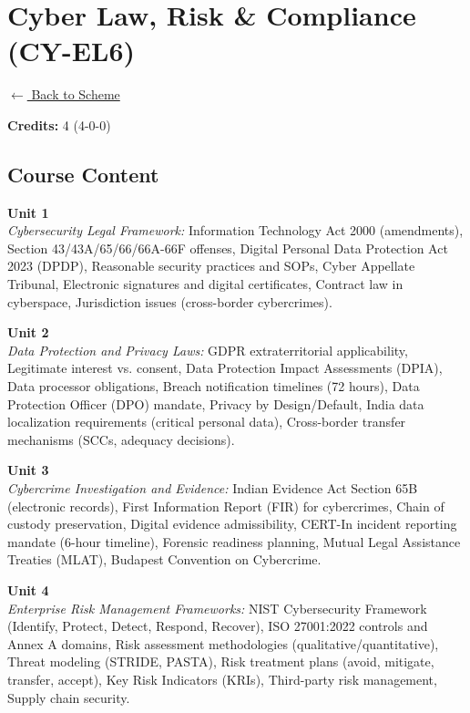 \section*{Cyber Law, Risk \& Compliance (CY-EL6)}
\label{elec:CY_6}

\noindent \small{\hyperref[main:scheme]{$\leftarrow$ Back to Scheme}} \vspace{0.5cm}

\noindent \textbf{Credits:} 4 (4-0-0)

\subsection*{Course Content}
\noindent\textbf{Unit 1} \\
\textit{Cybersecurity Legal Framework:} Information Technology Act 2000 (amendments), Section 43/43A/65/66/66A-66F offenses, Digital Personal Data Protection Act 2023 (DPDP), Reasonable security practices and SOPs, Cyber Appellate Tribunal, Electronic signatures and digital certificates, Contract law in cyberspace, Jurisdiction issues (cross-border cybercrimes).

\vspace{0.3cm}

\noindent\textbf{Unit 2} \\
\textit{Data Protection and Privacy Laws:} GDPR extraterritorial applicability, Legitimate interest vs. consent, Data Protection Impact Assessments (DPIA), Data processor obligations, Breach notification timelines (72 hours), Data Protection Officer (DPO) mandate, Privacy by Design/Default, India data localization requirements (critical personal data), Cross-border transfer mechanisms (SCCs, adequacy decisions).

\vspace{0.3cm}

\noindent\textbf{Unit 3} \\
\textit{Cybercrime Investigation and Evidence:} Indian Evidence Act Section 65B (electronic records), First Information Report (FIR) for cybercrimes, Chain of custody preservation, Digital evidence admissibility, CERT-In incident reporting mandate (6-hour timeline), Forensic readiness planning, Mutual Legal Assistance Treaties (MLAT), Budapest Convention on Cybercrime.

\vspace{0.3cm}

\noindent\textbf{Unit 4} \\
\textit{Enterprise Risk Management Frameworks:} NIST Cybersecurity Framework (Identify, Protect, Detect, Respond, Recover), ISO 27001:2022 controls and Annex A domains, Risk assessment methodologies (qualitative/quantitative), Threat modeling (STRIDE, PASTA), Risk treatment plans (avoid, mitigate, transfer, accept), Key Risk Indicators (KRIs), Third-party risk management, Supply chain security.


